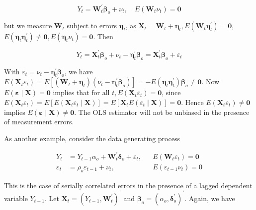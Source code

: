 \documentclass[10pt]{article}
\begin{document}
$$
Y_{t}=\mathbf{W}_{t}^{\prime} \boldsymbol{\beta}_{o}+\nu_{t}, \quad E\left(\mathbf{W}_{t} \nu_{t}\right)=\mathbf{0}
$$

but we measure $\mathbf{W}_{t}$ subject to errors $\boldsymbol{\eta}_{t}$, as $\mathbf{X}_{t}=\mathbf{W}_{t}+\boldsymbol{\eta}_{t}, E\left(\mathbf{W}_{t} \boldsymbol{\eta}_{t}^{\prime}\right)=\mathbf{0}$, $E\left(\boldsymbol{\eta}_{t} \boldsymbol{\eta}_{t}^{\prime}\right) \neq \mathbf{0}, E\left(\boldsymbol{\eta}_{t} \nu_{t}\right)=\mathbf{0}$. Then

$$
Y_{t}=\mathbf{X}_{t}^{\prime} \boldsymbol{\beta}_{o}+\nu_{t}-\boldsymbol{\eta}_{t}^{\prime} \boldsymbol{\beta}_{o}=\mathbf{X}_{t}^{\prime} \boldsymbol{\beta}_{o}+\varepsilon_{t}
$$

With $\varepsilon_{t}=\nu_{t}-\boldsymbol{\eta}_{t}^{\prime} \boldsymbol{\beta}_{o}$, we have $E\left(\mathbf{X}_{t} \varepsilon_{t}\right)=E\left[\left(\mathbf{W}_{t}+\boldsymbol{\eta}_{t}\right)\left(\nu_{t}-\boldsymbol{\eta}_{t}^{\prime} \boldsymbol{\beta}_{o}\right)\right]= -E\left(\boldsymbol{\eta}_{t} \boldsymbol{\eta}_{t}^{\prime}\right) \boldsymbol{\beta}_{o} \neq \mathbf{0}$. Now $E(\boldsymbol{\varepsilon} \mid \mathbf{X})=\mathbf{0}$ implies that for all $t, E\left(\mathbf{X}_{t} \varepsilon_{t}\right)=\mathbf{0}$, since $E\left(\mathbf{X}_{t} \varepsilon_{t}\right)=E\left[E\left(\mathbf{X}_{t} \varepsilon_{t} \mid \mathbf{X}\right)\right]=E\left[\mathbf{X}_{t} E\left(\varepsilon_{t} \mid \mathbf{X}\right)\right]=\mathbf{0}$. Hence $E\left(\mathbf{X}_{t} \varepsilon_{t}\right) \neq \mathbf{0}$ implies $E(\boldsymbol{\varepsilon} \mid \mathbf{X}) \neq \mathbf{0}$. The OLS estimator will not be unbiased in the presence of measurement errors.

As another example, consider the data generating process

$$
\begin{aligned}
Y_{t} & =Y_{t-1} \alpha_{o}+\mathbf{W}_{t}^{\prime} \boldsymbol{\delta}_{o}+\varepsilon_{t}, & & E\left(\mathbf{W}_{t} \varepsilon_{t}\right)=\mathbf{0} \\
\varepsilon_{t} & =\rho_{o} \varepsilon_{t-1}+\nu_{t}, & & E\left(\varepsilon_{t-1} \nu_{t}\right)=0
\end{aligned}
$$

This is the case of serially correlated errors in the presence of a lagged dependent variable $Y_{t-1}$. Let $\mathbf{X}_{t}=\left(Y_{t-1}, \mathbf{W}_{t}^{\prime}\right)^{\prime}$ and $\boldsymbol{\beta}_{o}=\left(\alpha_{o}, \boldsymbol{\delta}_{o}^{\prime}\right)^{\prime}$. Again, we have
\end{document}
